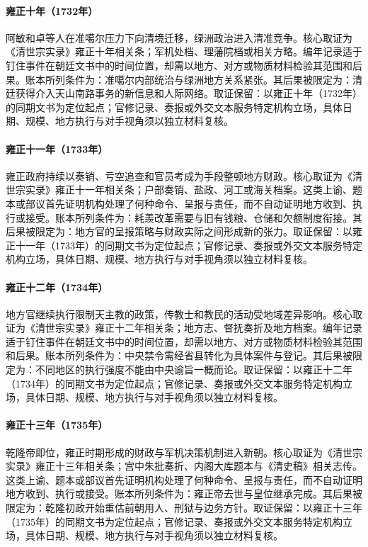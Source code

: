 \hypertarget{ledger:EQ-1732-AMIN-KHOJA-FLIGHT}{}\paragraph{雍正十年（1732年）}阿敏和卓等人在准噶尔压力下向清境迁移，绿洲政治进入清准竞争。核心取证为《清世宗实录》雍正十年相关条；军机处档、理藩院档或相关方略。编年记录适于钉住事件在朝廷文书中的时间位置，却需以地方、对方或物质材料检验其范围和后果。账本所列条件为：准噶尔内部统治与绿洲地方关系紧张。其后果被限定为：清廷获得介入天山南路事务的新信息和人际网络。取证保留：以雍正十年（1732年）的同期文书为定位起点；官修记录、奏报或外交文本服务特定机构立场，具体日期、规模、地方执行与对手视角须以独立材料复核。
\hypertarget{ledger:EQ-1733-YONGZHENG-FISCAL-INSPECTION}{}\paragraph{雍正十一年（1733年）}雍正政府持续以奏销、亏空追查和官员考成为手段整顿地方财政。核心取证为《清世宗实录》雍正十一年相关条；户部奏销、盐政、河工或海关档案。这类上谕、题本或部议首先证明机构处理了何种命令、呈报与责任，而不自动证明地方收到、执行或接受。账本所列条件为：耗羡改革需要与旧有钱粮、仓储和欠额制度衔接。其后果被限定为：地方官的呈报策略与财政实际之间形成新的张力。取证保留：以雍正十一年（1733年）的同期文书为定位起点；官修记录、奏报或外交文本服务特定机构立场，具体日期、规模、地方执行与对手视角须以独立材料复核。
\hypertarget{ledger:EQ-1734-CHRISTIAN-ENFORCEMENT}{}\paragraph{雍正十二年（1734年）}地方官继续执行限制天主教的政策，传教士和教民的活动受地域差异影响。核心取证为《清世宗实录》雍正十二年相关条；地方志、督抚奏折及地方档案。编年记录适于钉住事件在朝廷文书中的时间位置，却需以地方、对方或物质材料检验其范围和后果。账本所列条件为：中央禁令需经省县转化为具体案件与登记。其后果被限定为：不同地区的执行强度不能由中央谕旨一概而论。取证保留：以雍正十二年（1734年）的同期文书为定位起点；官修记录、奏报或外交文本服务特定机构立场，具体日期、规模、地方执行与对手视角须以独立材料复核。
\hypertarget{ledger:EQ-1735-QIANLONG-ACCESSION}{}\paragraph{雍正十三年（1735年）}乾隆帝即位，雍正时期形成的财政与军机决策机制进入新朝。核心取证为《清世宗实录》雍正十三年相关条；宫中朱批奏折、内阁大库题本与《清史稿》相关志传。这类上谕、题本或部议首先证明机构处理了何种命令、呈报与责任，而不自动证明地方收到、执行或接受。账本所列条件为：雍正帝去世与皇位继承完成。其后果被限定为：乾隆初政开始重估前朝用人、刑狱与边务方针。取证保留：以雍正十三年（1735年）的同期文书为定位起点；官修记录、奏报或外交文本服务特定机构立场，具体日期、规模、地方执行与对手视角须以独立材料复核。
